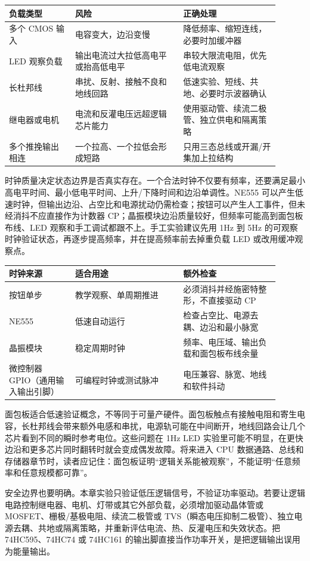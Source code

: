 \begin{longtable}{L{0.22\linewidth}L{0.36\linewidth}L{0.32\linewidth}}
\toprule
负载类型 & 风险 & 正确处理 \\
\midrule
多个 CMOS 输入 & 电容变大，边沿变慢 & 降低频率、缩短连线，必要时加缓冲器 \\
LED 观察负载 & 输出电流过大拉低高电平或抬高低电平 & 串较大限流电阻，优先低电流观察 \\
长杜邦线 & 串扰、反射、接触不良和地线回路 & 低速实验、短线、共地、必要时示波器确认 \\
继电器或电机 & 电流和反灌电压远超逻辑芯片能力 & 使用驱动管、续流二极管、独立供电和隔离策略 \\
多个推挽输出相连 & 一个拉高、一个拉低会形成短路 & 只用三态总线或开漏/开集加上拉结构 \\
\bottomrule
\end{longtable}
时钟质量决定状态边界是否真实存在。一个合法时钟不仅要有频率，还要满足最小高电平时间、最小低电平时间、上升/下降时间和边沿单调性。NE555 可以产生低速时钟，但输出边沿、占空比和电源扰动仍需检查；按钮可以产生人工事件，但未经消抖不应直接作为计数器 CP；晶振模块边沿质量较好，但频率可能高到面包板布线、LED 观察和手工调试都跟不上。手工实验建议先用 1Hz 到 5Hz 的可观察时钟验证状态，再逐步提高频率，并在提高频率前去掉重负载 LED 或改用缓冲观察点。

\begin{longtable}{L{0.22\linewidth}L{0.36\linewidth}L{0.32\linewidth}}
\toprule
时钟来源 & 适合用途 & 额外检查 \\
\midrule
按钮单步 & 教学观察、单周期推进 & 必须消抖并经施密特整形，不直接驱动 CP \\
NE555 & 低速自动运行 & 检查占空比、电源去耦、边沿和最小脉宽 \\
晶振模块 & 稳定周期时钟 & 频率、电压域、输出负载和面包板布线余量 \\
微控制器 GPIO（通用输入输出引脚） & 可编程时钟或测试脉冲 & 电压兼容、脉宽、地线和软件抖动 \\
\bottomrule
\end{longtable}

面包板适合低速验证概念，不等同于可量产硬件。面包板触点有接触电阻和寄生电容，长杜邦线会带来额外电感和串扰，电源轨可能在中间断开，地线回路会让几个芯片看到不同的瞬时参考电位。这些问题在 1Hz LED 实验里可能不明显，在更快边沿和更多芯片同时翻转时就会变成偶发故障。将来进入 CPU 数据通路、总线和存储器章节时，读者应记住：面包板证明“逻辑关系能被观察”，不能证明“任意频率和任意规模都可靠”。

安全边界也要明确。本章实验只验证低压逻辑信号，不验证功率驱动。若要让逻辑电路控制继电器、电机、灯带或其它外部负载，必须增加驱动晶体管或 MOSFET、栅极/基极电阻、续流二极管或 TVS（瞬态电压抑制二极管）、独立电源去耦、共地或隔离策略，并重新评估电流、热、反灌电压和失效状态。把 74HC595、74HC74 或 74HC161 的输出脚直接当作功率开关，是把逻辑输出误用为能量输出。

